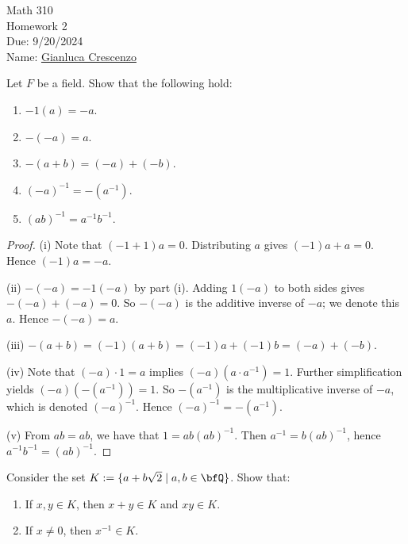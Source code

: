 \documentclass[10pt,twoside,openany]{memoir}
\begin{document}
\begin{center}
    { \Large Math 310 \\[0.1in]Homework 2 \\[0.1in]
    Due: 9/20/2024}\\[.25in]
    { Name:} {\underline{Gianluca Crescenzo\hspace*{2in}}}\\[0.15in]
    \end{center}
    \vspace{4pt}
    \begin{exercise}
        Let $F$ be a field. Show that the following hold:
            \begin{enumerate}[label = (\roman*)]
                \item $-1(a) = -a$.
                \item $-(-a) = a$.
                \item $-(a+b) = (-a) + (-b)$.
                \item $(-a)^{-1} = -(a^{-1})$.
                \item $(ab)^{-1} = a^{-1}b^{-1}$.
            \end{enumerate}
    \end{exercise}
        \begin{proof}
            (i) Note that $(-1 +1)a = 0$. Distributing $a$ gives $(-1)a + a = 0$. Hence $(-1)a = -a$.

            (ii) $-(-a) = -1(-a)$ by part (i). Adding $1(-a)$ to both sides gives $-(-a) + (-a) = 0$. So $-(-a)$ is the additive inverse of $-a$; we denote this $a$. Hence $-(-a) = a$.

            (iii) $-(a+b) = (-1)(a+b) = (-1)a + (-1)b = (-a) + (-b)$.

            (iv) Note that $(-a)\cdot 1 = a$ implies $(-a)(a \cdot a^{-1}) = 1$. Further simplification yields $(-a)(-(a^{-1})) = 1$. So $-(a^{-1})$ is the multiplicative inverse of $-a$, which is denoted $(-a)^{-1}$. Hence $(-a)^{-1} = -(a^{-1})$.

            (v) From $ab = ab$, we have that $1 = ab(ab)^{-1}$. Then $a^{-1} = b(ab)^{-1}$, hence $a^{-1}b^{-1} = (ab)^{-1}$.

        
        \end{proof}
    \begin{exercise}
        Consider the set $K := \{a+b\sqrt{2} \mid a,b \in \bfQ\}$. Show that:
            \begin{enumerate}[label = (\roman*)]
                \item If $x,y \in K$, then $x+y \in K$ and $xy \in K$.
                \item If $x \neq 0$, then $x^{-1} \in K$.
            \end{enumerate}
    \end{exercise}
\end{document}
